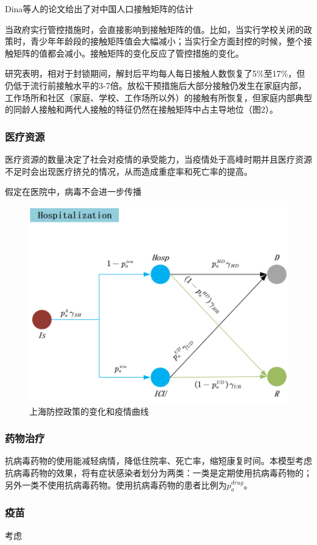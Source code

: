 \documentclass[bwprint]{gmcmthesis}
\numberwithin{figure}{section}
\begin{document}
Dina等人的论文给出了对中国人口接触矩阵的估计
\par 当政府实行管控措施时，会直接影响到接触矩阵的值。比如，当实行学校关闭的政策时，青少年年龄段的接触矩阵值会大幅减小；当实行全方面封控的时候，整个接触矩阵的值都会减小。接触矩阵的变化反应了管控措施的变化。
\par 研究表明，相对于封锁期间，解封后平均每人每日接触人数恢复了5\%至17\%，但仍低于流行前接触水平的3-7倍。放松干预措施后大部分接触仍发生在家庭内部，工作场所和社区（家庭、学校、工作场所以外）的接触有所恢复，但家庭内部典型的同龄人接触和两代人接触的特征仍然在接触矩阵中占主导地位（图2）。
\subsubsection{医疗资源}
医疗资源的数量决定了社会对疫情的承受能力，当疫情处于高峰时期并且医疗资源不足时会出现医疗挤兑的情况，从而造成重症率和死亡率的提高。
\par 假定在医院中，病毒不会进一步传播
\begin{figure}[!h]
\centering
\includegraphics[width=.75\textwidth]{hospital.png}
\caption{上海防控政策的变化和疫情曲线}
\label{fig3}
\end{figure}
\subsubsection{药物治疗}
抗病毒药物的使用能减轻病情，降低住院率、死亡率，缩短康复时间。本模型考虑抗病毒药物的效果，将有症状感染者划分为两类：一类是定期使用抗病毒药物的；另外一类不使用抗病毒药物。使用抗病毒药物的患者比例为$p_a^{drug}$。
\subsubsection{疫苗}
考虑
\end{document}
